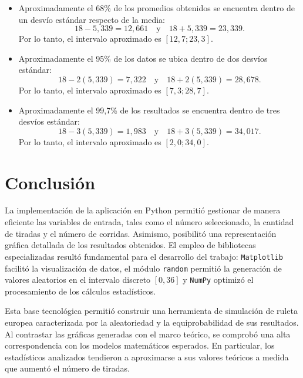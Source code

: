 \documentclass{article}
\begin{document}
\begin{itemize}
    \item Aproximadamente el 68\% de los promedios obtenidos se encuentra dentro de un desvío estándar respecto de la media:
    \begin{equation}
        18 - 5{,}339 = 12{,}661 \quad \text{y} \quad 18 + 5{,}339 = 23{,}339.
    \end{equation}
    Por lo tanto, el intervalo aproximado es $[12{,}7; 23{,}3]$.

    \item Aproximadamente el 95\% de los datos se ubica dentro de dos desvíos estándar:
    \begin{equation}
        18 - 2(5{,}339) = 7{,}322 \quad \text{y} \quad 18 + 2(5{,}339) = 28{,}678.
    \end{equation}
    Por lo tanto, el intervalo aproximado es $[7{,}3; 28{,}7]$.

    \item Aproximadamente el 99{,}7\% de los resultados se encuentra dentro de tres desvíos estándar:
    \begin{equation}
        18 - 3(5{,}339) = 1{,}983 \quad \text{y} \quad 18 + 3(5{,}339) = 34{,}017.
    \end{equation}
    Por lo tanto, el intervalo aproximado es $[2{,}0; 34{,}0]$.
\end{itemize}

\newpage

\section{Conclusión}

La implementación de la aplicación en Python permitió gestionar de manera eficiente las variables de entrada, tales como el número seleccionado, la cantidad de tiradas y el número de corridas. Asimismo, posibilitó una representación gráfica detallada de los resultados obtenidos. El empleo de bibliotecas especializadas resultó fundamental para el desarrollo del trabajo: \texttt{Matplotlib} facilitó la visualización de datos, el módulo \texttt{random} permitió la generación de valores aleatorios en el intervalo discreto $[0,36]$ y \texttt{NumPy} optimizó el procesamiento de los cálculos estadísticos.

Esta base tecnológica permitió construir una herramienta de simulación de ruleta europea caracterizada por la aleatoriedad y la equiprobabilidad de sus resultados. Al contrastar las gráficas generadas con el marco teórico, se comprobó una alta correspondencia con los modelos matemáticos esperados. En particular, los estadísticos analizados tendieron a aproximarse a sus valores teóricos a medida que aumentó el número de tiradas.
\end{document}
